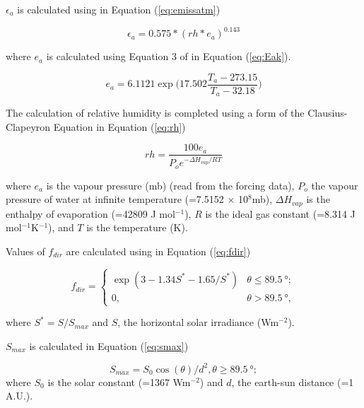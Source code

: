 \documentclass[preprint,12pt,authoryear]{elsarticle}
\begin{document}
$\epsilon_{a}$ is calculated using \cite{Oke1987z} in Equation (\ref{eq:emissatm})


\begin{equation}\label{eq:emissatm}
    \epsilon_{a} = 0.575 * (rh * e_{a} )^{0.143}
\end{equation}


where $e_{a}$ is calculated using Equation 3 of \cite{Buck1981} in Equation (\ref{eq:Eak}).


\begin{equation}\label{eq:Eak}
       e_{a}= 6.1121  \exp\Big(17.502  \frac{T_{a} - 273.15 }{ T_{a} - 32.18}\Big)
\end{equation}


The calculation of relative humidity is completed using a form of the Clausius-Clapeyron Equation in Equation (\ref{eq:rh})

\begin{equation}\label{eq:rh}
  rh =
  \frac {100  e_{a} }
   {P_{o}  e^{ -\Delta H_{vap} / R   T}  }
\end{equation}

where $e_{a}$ is the vapour pressure (mb) (read from the forcing data), $P_{o}$ the vapour pressure of water at infinite temperature (=7.5152 $\times$ 10$^8$mb), $\Delta H_{vap}$ is the enthalpy of evaporation (=42809 J mol$^{-1}$), $R$ is the ideal gas constant (=8.314 J mol$^{-1}$K$^{-1}$), and $T$ is the temperature (K).


Values of $f_{dir}$ are calculated using \cite{Liljegren2008} in Equation (\ref{eq:fdir})

\begin{equation}\label{eq:fdir}
f_{dir} =  
\begin{cases}
 \exp(3-1.34S^{*}-1.65/S^{*}) & \theta   \leq  \SI{89.5}{\degree} ; \\
  0, & \theta   >  \SI{89.5}{\degree} ,
\end{cases}
 \end{equation}

where $S^{*} = S/S_{max}$ and $S$, the horizontal solar irradiance (Wm$^{-2}$).  

$S_{max}$ is calculated in Equation (\ref{eq:smax})


\begin{equation}\label{eq:smax}
  S_{max} =
  S_{0} \cos(\theta) /d^{2}, \theta \geq \SI{89.5}{\degree};
\end{equation}
 where $S_{0}$ is the solar constant (=1367 Wm$^{-2}$) 
 and $d$, the earth-sun distance (=1 A.U.).
\end{document}
